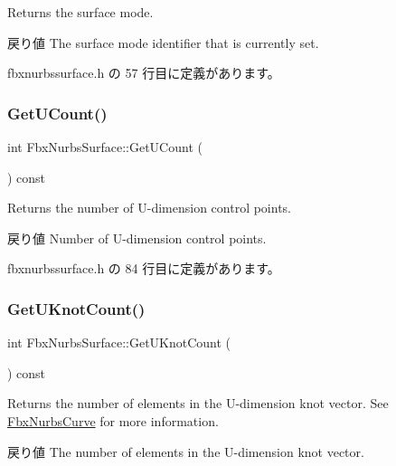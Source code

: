 Returns the surface mode. \begin{DoxyReturn}{戻り値}
The surface mode identifier that is currently set. 
\end{DoxyReturn}


 fbxnurbssurface.\+h の 57 行目に定義があります。

\mbox{\label{class_fbx_nurbs_surface_aed399de214fdd1f387289428626df0da}} 
\subsubsection{\texorpdfstring{Get\+U\+Count()}{GetUCount()}}
{\footnotesize\ttfamily int Fbx\+Nurbs\+Surface\+::\+Get\+U\+Count (\begin{DoxyParamCaption}{ }\end{DoxyParamCaption}) const\hspace{0.3cm}{\ttfamily [inline]}}

Returns the number of U-\/dimension control points. \begin{DoxyReturn}{戻り値}
Number of U-\/dimension control points. 
\end{DoxyReturn}


 fbxnurbssurface.\+h の 84 行目に定義があります。

\mbox{\label{class_fbx_nurbs_surface_adc42200550501843d8a31b9a3d895337}} 
\subsubsection{\texorpdfstring{Get\+U\+Knot\+Count()}{GetUKnotCount()}}
{\footnotesize\ttfamily int Fbx\+Nurbs\+Surface\+::\+Get\+U\+Knot\+Count (\begin{DoxyParamCaption}{ }\end{DoxyParamCaption}) const}

Returns the number of elements in the U-\/dimension knot vector. See \hyperlink{class_fbx_nurbs_curve}{Fbx\+Nurbs\+Curve} for more information. \begin{DoxyReturn}{戻り値}
The number of elements in the U-\/dimension knot vector. 
\end{DoxyReturn}
\mbox{\label{class_fbx_nurbs_surface_a34c4fa7619bbd3293074929f14d1ae42}} 

